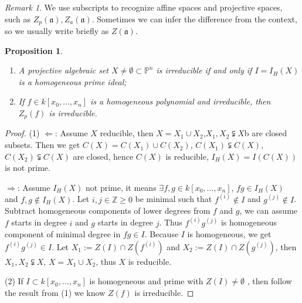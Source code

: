 \documentclass{amsart}
\theoremstyle{plain}
\newtheorem{proposition}{Proposition}
\theoremstyle{definition}
\theoremstyle{remark}
\newtheorem*{remark}{Remark}
\numberwithin{equation}{section}
\begin{document}
\begin{remark}
	We use subscripts to recognize affine spaces and projective spaces, such as $ Z_p(\mathfrak{a}),Z_a(\mathfrak{a}) $. Sometimes we can infer the difference from the context, so we usually write briefly as $ Z(\mathfrak{a}) $.
\end{remark}
\begin{proposition}
	\begin{enumerate}
		\item A projective algebraic set $ X\neq \emptyset\subset \mathbb{P}^n $ is irreducible if and only if $ I=I_H(X) $ is a homogeneous prime ideal;
		\item If $ f\in k[x_0,\dots,x_n] $ is a homogeneous polynomial and irreducible, then $ Z_p(f) $ is irreducible.
	\end{enumerate}
\end{proposition}
\begin{proof}
	(1) $ \Leftarrow $: Assume $ X $ reducible, then $ X=X_1\cup X_2 $,$ X_1,X_2\subsetneqq X $b are closed subsets. Then we get $ C(X)=C(X_1)\cup C(X_2) $, $ C(X_1)\subsetneqq C(X) $,$ C(X_2)\subsetneqq C(X) $ are closed, hence  $ C(X) $ is reducible, $ I_H(X)=I(C(X)) $ is not prime.
	
	$ \Rightarrow $: Assume $ I_H(X) $ not prime, it means $ \exists f,g\in k[x_0,\dots,x_n] $, $ fg\in I_H(X) $ and $ f,g\not\in I_H(X) $. Let $ i,j\in\mathbb{Z}\geq 0 $ be minimal such that $ f^{(i)}\not\in I $ and $ g^{(j)}\not\in I $. Subtract homogeneous components of lower degrees from $ f $ and $ g $, we can assume $ f $ starts in degree $ i $ and $ g $ starts in degree $ j $. Thus $ f^{(i)}g^{(j)} $  is homogeneous component of minimal degree in $ fg\in I $. Because $ I $ is homogeneous,  we get $ f^{(i)}g^{(j)} \in I$. Let
	$ X_1:=Z(I)\cap Z(f^(i)) $ and $ X_2:=Z(I)\cap Z(g^{(j)}) $, then $ X_1,X_2\subsetneqq X $, $ X=X_1\cup X_2 $, thus $ X $ is reducible.
	
	(2) If $ I\subset k[x_0,\dots,x_n] $ is homogeneous and prime with $ Z(I)\neq\emptyset $ , then follow the result from (1) we know $ Z(f) $ is irreducible.
\end{proof}
\end{document}
